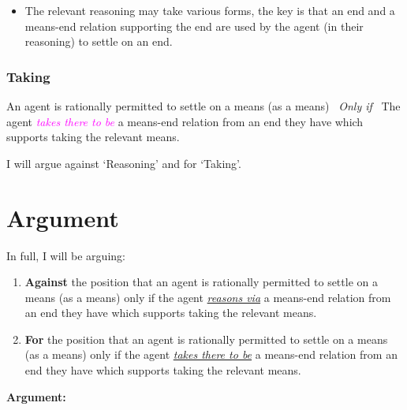 \documentclass[10pt]{article}
\newenvironment{beamerblock}[1]{%
  \tcolorbox[standard,%
  no shadow,
  noparskip,
  colback=white,
  colframe=black,
  colbacktitle=white,
  coltitle=black,
  colupper=black,
  size=small,
  boxrule=.125mm,
  fonttitle=\bfseries,
  sharp corners=all,
  title=#1]}%
{\endtcolorbox}
\newcommand{\hozlinedash}[0]{%
  \noindent\hdashrule[0.5ex][c]{\textwidth}{.1pt}{2.5pt}
}
\begin{document}
\begin{itemize}
\item The relevant reasoning may take various forms, the key is that an end and a means-end relation supporting the end are used by the agent (in their reasoning) to settle on an end.
\end{itemize}


\subsubsection{Taking}
\label{sec:taking}

\begin{beamerblock}{Taking}
    An agent is rationally permitted to settle on a means (as a means)
    \newline
    \mbox{ }\hfill\emph{Only if}\hfill\mbox{ }
    \newline
    The agent \textcolor{fuchsia}{\emph{takes there to be}} a means-end relation from an end they have which supports taking the relevant means.
  \end{beamerblock}



\hozlinedash

I will argue against `Reasoning' and for `Taking'.



\hozlinedash

\newpage

\section{Argument}
\label{sec:argument}

In full, I will be arguing:
\begin{enumerate}[label=\Roman*., ref=(\Roman*)]
\item\label{position:Against} \textbf{Against} the position that an agent is rationally permitted to settle on a means (as a means) only if the agent \underline{\emph{reasons via}} a means-end relation from an end they have which supports taking the relevant means.

\item\label{position:For} \textbf{For} the position that an agent is rationally permitted to settle on a means (as a means) only if the agent \underline{\emph{takes there to be}} a means-end relation from an end they have which supports taking the relevant means.
\end{enumerate}

\noindent\textbf{Argument:}
\end{document}
